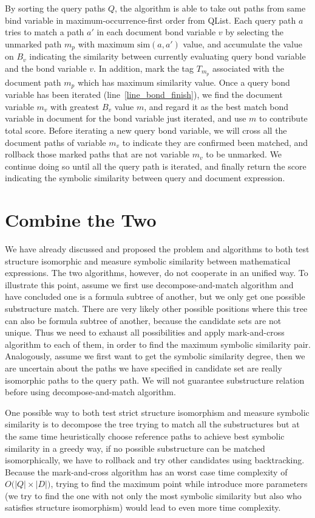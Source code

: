 By sorting the query paths $Q$, the algorithm is able to take out paths from same bind variable in maximum-occurrence-first order from QList. 
Each query path $a$ tries to match a path $a'$ in each document bond variable $v$ by selecting the unmarked path $m_p$ with maximum $\mathrm{sim}(a,a')$ value, and accumulate the value on $B_v$ indicating the similarity between currently evaluating query bond variable and the bond variable $v$.
In addition, mark the tag $T_{m_p}$ associated with the document path $m_p$ which has maximum similarity value.
Once a query bond variable has been iterated (line~\ref{line_bond_finish}),
we find the document variable $m_v$ with greatest $B_v$ value $m$, and regard it as the best match bond variable in document for the bond variable just iterated, and use $m$ to contribute total score.
Before iterating a new query bond variable, we will cross all the document paths of variable $m_v$ to indicate they are confirmed been matched, 
and rollback those marked paths that are not variable $m_v$ to be unmarked.
We continue doing so until all the query path is iterated, and finally return the score indicating the symbolic similarity between query and document expression.

\section{Combine the Two}
We have already discussed and proposed the problem and algorithms to both test structure isomorphic and measure symbolic similarity between mathematical expressions. The two algorithms, however, do not cooperate in an unified way. 
To illustrate this point, assume we first use decompose-and-match algorithm and have concluded one is a formula subtree of another, but we only get one possible substructure match. 
There are very likely other possible positions where this tree can also be formula subtree of another, because the candidate sets are not unique. 
Thus we need to exhaust all possibilities and apply mark-and-cross algorithm to each of them, in order to find the maximum symbolic similarity pair. 
Analogously, assume we first want to get the symbolic similarity degree, then we are uncertain about the paths we have specified in candidate set are really isomorphic paths to the query path. 
We will not guarantee substructure relation before using decompose-and-match algorithm.

One possible way to both test strict structure isomorphism and measure symbolic similarity is to decompose the tree trying to match all the substructures but at the same time heuristically choose reference paths to achieve best symbolic similarity in a greedy way, if no possible substructure can be matched isomorphically, we have to rollback and try other candidates using backtracking.
Because the mark-and-cross algorithm has an worst case time complexity of $O\big(|Q| \times |D|\big)$,
trying to find the maximum point while introduce more parameters (we try to find the one with not only the most symbolic similarity but also who satisfies structure isomorphism) would lead to even more time complexity. 

